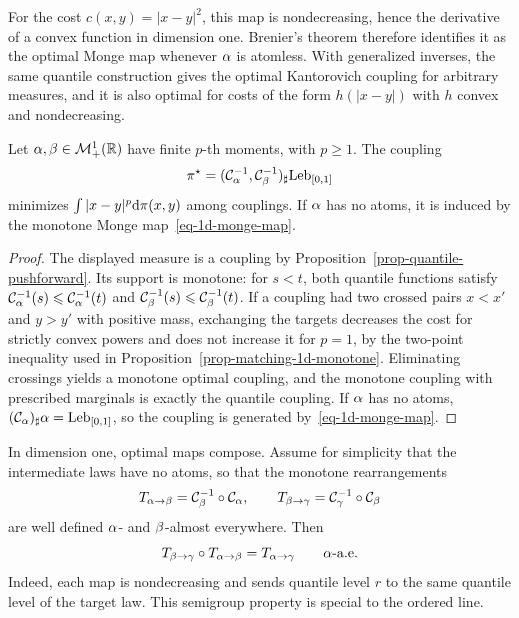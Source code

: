 For the cost $c(x,y)=|x-y|^2$, this map is nondecreasing, hence the derivative of a convex function in dimension one. Brenier's theorem therefore identifies it as the optimal Monge map whenever $\alpha$ is atomless. With generalized inverses, the same quantile construction gives the optimal Kantorovich coupling for arbitrary measures, and it is also optimal for costs of the form $h(|x-y|)$ with $h$ convex and nondecreasing.

\begin{prop}\label{prop-1d-quantile-map}
	Let $\alpha,\beta\in\mathcal{M}_+^1(\mathbb{R})$ have finite $p$-th moments, with $p\geq1$. The coupling
	\[
		\pi^\star=(\mathcal{C}_{\alpha}^{-1},\mathcal{C}_{\beta}^{-1})_\sharp\mathrm{Leb}_{[0,1]}
	\]
	minimizes $\int |x-y|^p\mathrm{d}\pi(x,y)$ among couplings. If $\alpha$ has no atoms, it is induced by the monotone Monge map~\eqref{eq-1d-monge-map}.
\end{prop}
\begin{proof}
		The displayed measure is a coupling by Proposition~\ref{prop-quantile-pushforward}. Its support is monotone: for $s<t$, both quantile functions satisfy $\mathcal{C}_{\alpha}^{-1}(s)\leqslant\mathcal{C}_{\alpha}^{-1}(t)$ and $\mathcal{C}_{\beta}^{-1}(s)\leqslant\mathcal{C}_{\beta}^{-1}(t)$. If a coupling had two crossed pairs $x<x'$ and $y>y'$ with positive mass, exchanging the targets decreases the cost for strictly convex powers and does not increase it for $p=1$, by the two-point inequality used in Proposition~\ref{prop-matching-1d-monotone}. Eliminating crossings yields a monotone optimal coupling, and the monotone coupling with prescribed marginals is exactly the quantile coupling. If $\alpha$ has no atoms, $(\mathcal{C}_{\alpha})_\sharp\alpha=\mathrm{Leb}_{[0,1]}$, so the coupling is generated by~\eqref{eq-1d-monge-map}.
\end{proof}

\begin{rem}\label{rem-1d-composition-optimal}
	In dimension one, optimal maps compose. Assume for simplicity that the intermediate laws have no atoms, so that the monotone rearrangements
	\[
		T_{\alpha\to\beta}=\mathcal{C}_{\beta}^{-1}\circ\mathcal{C}_{\alpha},
		\qquad
		T_{\beta\to\gamma}=\mathcal{C}_{\gamma}^{-1}\circ\mathcal{C}_{\beta}
	\]
	are well defined $\alpha$- and $\beta$-almost everywhere. Then
	\[
		T_{\beta\to\gamma}\circ T_{\alpha\to\beta}
		=
		T_{\alpha\to\gamma}
		\qquad \alpha\text{-a.e.}
	\]
	Indeed, each map is nondecreasing and sends quantile level $r$ to the same quantile level of the target law. This semigroup property is special to the ordered line.
\end{rem}

